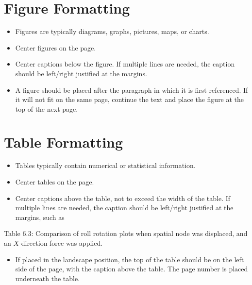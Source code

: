 	\section{Figure Formatting}
	\begin{itemize}
		\item Figures are typically diagrams, graphs, pictures, maps, or charts.
		\item Center figures on the page.
		\item Center captions below the figure. If multiple lines are needed, the caption should be left/right justified at the margins.
		\item A figure should be placed after the paragraph in which it is first referenced. If it will not fit on the same page, continue the text and place the figure at the top of the next page.
	\end{itemize}
	
	\section{Table Formatting}
	\begin{itemize}
		\item Tables typically contain numerical or statistical information.
		\item Center tables on the page.
		\item Center captions above the table, not to exceed the width of the table. If multiple lines are needed, the caption should be left/right justified at the margins, such as
	\end{itemize}
	
	\noindent Table 6.3: Comparison of roll rotation plots when spatial node was displaced, and an $X$-direction force was applied.
	
	\begin{itemize}
		\item If placed in the landscape position, the top of the table should be on the left side of the page, with the caption above the table. The page number is placed underneath the table.
	\end{itemize}